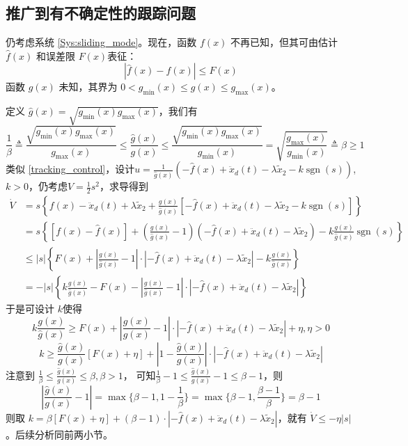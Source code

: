 \subsection{推广到有不确定性的跟踪问题}\label{5C3ref}
仍考虑系统 \eqref{Sys:sliding_mode}。现在，函数 $f (x)$ 不再已知，但其可由估计$\hat{f} (x)$ 和误差限 $F (x)$表征：
\[ | \hat{f} (x) - f (x) | \leq F (x) \]
函数 $g (x)$ 未知，其界为 $0 < g_{\min} (x) \leq g (x) \leq g_{\max}(x)$。

定义 $\hat{g} (x) = \sqrt{g_{\min} (x) g_{\max} (x)}$，我们有
\[ \frac{1}{\beta} \triangleq \frac{\sqrt{g_{\min} (x) g_{\max}
   (x)}}{g_{\max} (x)} \leq \frac{\hat{g} (x)}{g (x)} \leq
   \frac{\sqrt{g_{\min} (x) g_{\max} (x)}}{g_{\min} (x)} =
   \sqrt{\frac{g_{\max} (x)}{g_{\min} (x)}} \triangleq \beta \geq 1 \]
类似 \eqref{tracking_control}，设计$u = \frac{1}{\hat{g} (x)} (- \hat{f} (x) + \ddot{x}_d (t) - \lambda
\tilde{x}_2 - k  \ensuremath{\operatorname{sgn}} (s))$, $k > 0$，仍考虑$V=\frac12 s^2$，求导得到
\begin{align*}
  \dot{V} & = s \left\{ f (x) - \ddot{x}_d (t) + \lambda \tilde{x}_2 +
  \frac{g (x)}{\hat{g} (x)} [- \hat{f} (x) + \ddot{x}_d (t) - \lambda
  \tilde{x}_2 - k  \ensuremath{\operatorname{sgn}} (s)] \right\}\\
  & = s \left\{ [f (x) - \hat{f} (x)] + \left( \frac{g (x)}{\hat{g} (x)} -
  1 \right) (- \hat{f} (x) + \ddot{x}_d (t) - \lambda \tilde{x}_2) - k \frac{g
  (x)}{\hat{g} (x)}  \ensuremath{\operatorname{sgn}} (s) \right\}\\
  & \leq | s | \left\{ F (x) + \left| \frac{g (x)}{\hat{g} (x)} - 1 \right|
  \cdot | - \hat{f} (x) + \ddot{x}_d (t) - \lambda \tilde{x}_2 | - k \frac{g
  (x)}{\hat{g} (x)} \right\}\\
  & = - | s | \left\{ k \frac{g (x)}{\hat{g} (x)} - F (x) - \left| \frac{g
  (x)}{\hat{g} (x)} - 1 \right| \cdot | - \hat{f} (x) + \ddot{x}_d (t) -
  \lambda \tilde{x}_2 | \right\}
\end{align*}
于是可设计 $k$使得
\[ k \frac{g (x)}{\hat{g} (x)} \geq F (x) + \left| \frac{g (x)}{\hat{g} (x)} -
   1 \right| \cdot | - \hat{f} (x) + \ddot{x}_d (t) - \lambda \tilde{x}_2 | +
   \eta, \eta > 0 \]
\[ k \geq \frac{\hat{g} (x)}{g (x)} [F (x) + \eta] + \left| 1 - \frac{\hat{g}
   (x)}{g (x)} \right| \cdot | - \hat{f} (x) + \ddot{x}_d (t) - \lambda
   \tilde{x}_2 | \]
注意到 $\frac{1}{\beta} \leq \frac{\hat{g} (x)}{g (x)} \leq \beta, \beta >1$，
可知$ \frac1\beta -1\le \frac{\hat{g}(x)}{g (x)}-1 \le\beta-1 $，则\[\left|  \frac{\hat{g}
   (x)}{g (x)}-1 \right|=\max\{\beta-1,1-\frac{1}{\beta}\}=\max\{\beta-1,\frac{\beta-1}{\beta}\}=\beta-1\]
则取 $k = \beta [F (x) + \eta] + (\beta - 1) \cdot | - \hat{f} (x) +\ddot{x}_d (t) - \lambda \tilde{x}_2 |$，就有 $\dot{V} \leq - \eta | s|$。后续分析同前两小节。
